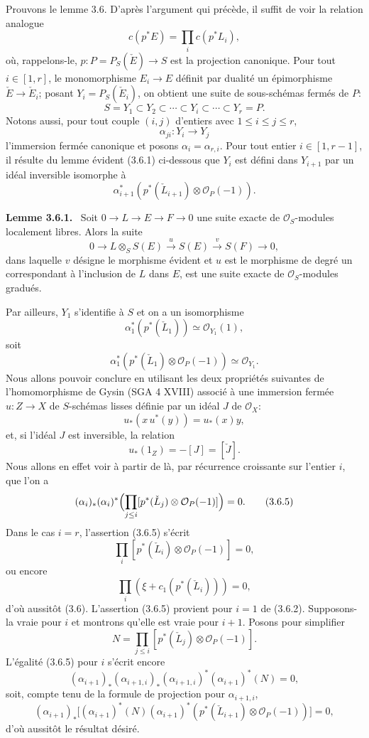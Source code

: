 \documentclass[11pt]{article}
\newenvironment{statement}[1]{\par\medskip\noindent\textbf{#1.}\ }{\par\medskip}
\begin{document}
Prouvons le lemme 3.6. D'après l'argument qui précède, il suffit de voir la relation analogue
\[
c(p^*E)=\prod_i c(p^*L_i),
\]
où, rappelons-le, $p:P=P_S(\check E)\to S$ est la projection canonique. Pour tout $i\in[1,r]$, le monomorphisme $E_i\to E$ définit par dualité un épimorphisme $\check E\to\check E_i$; posant $Y_i=P_S(\check E_i)$, on obtient une suite de sous-schémas fermés de $P$:
\[
S=Y_1\subset Y_2\subset\cdots\subset Y_i\subset\cdots\subset Y_r=P.
\]
Notons aussi, pour tout couple $(i,j)$ d'entiers avec $1\le i\le j\le r$,
\[
\alpha_{ji}:Y_i\to Y_j
\]
l'immersion fermée canonique et posons $\alpha_i=\alpha_{r,i}$. Pour tout entier $i\in[1,r-1]$, il résulte du lemme évident (3.6.1) ci-dessous que $Y_i$ est défini dans $Y_{i+1}$ par un idéal inversible isomorphe à
\[
\alpha_{i+1}^*(p^*(\check L_{i+1})\otimes\mathcal O_P(-1)).
\]

\begin{statement}{Lemme 3.6.1}
Soit $0\to L\to E\to F\to0$ une suite exacte de $\mathcal O_S$-modules localement libres. Alors la suite
\[
0\to L\otimes_S S(E)\xrightarrow{u}S(E)\xrightarrow{v}S(F)\to0,
\]
dans laquelle $v$ désigne le morphisme évident et $u$ est le morphisme de degré un correspondant à l'inclusion de $L$ dans $E$, est une suite exacte de $\mathcal O_S$-modules gradués.
\end{statement}

Par ailleurs, $Y_1$ s'identifie à $S$ et on a un isomorphisme
\[
\alpha_1^*(p^*(\check L_1))\simeq\mathcal O_{Y_1}(1),
\]
soit
\[
\alpha_1^*(p^*(\check L_1)\otimes\mathcal O_P(-1))\simeq \mathcal O_{Y_1}.
\tag{3.6.2}
\]
Nous allons pouvoir conclure en utilisant les deux propriétés suivantes de l'homomorphisme de Gysin (SGA 4 XVIII) associé à une immersion fermée $u:Z\to X$ de $S$-schémas lisses définie par un idéal $J$ de $\mathcal O_X$:
\[
u_*(x\,u^*(y))=u_*(x)y,
\tag{3.6.3}
\]
et, si l'idéal $J$ est inversible, la relation
\[
u_*(1_Z)=-[J]=[\check J].
\tag{3.6.4}
\]
Nous allons en effet voir à partir de là, par récurrence croissante sur l'entier $i$, que l'on a
\[
(\alpha_i)_*(\alpha_i)^*\Bigl(\prod_{j\le i}[p^*(\check L_j)\otimes\mathcal O_P(-1)]\Bigr)=0.
\tag{3.6.5}
\]
Dans le cas $i=r$, l'assertion (3.6.5) s'écrit
\[
\prod_i[p^*(\check L_i)\otimes\mathcal O_P(-1)]=0,
\]
ou encore
\[
\prod_i(\xi+c_1(p^*(\check L_i)))=0,
\]
d'où aussitôt (3.6). L'assertion (3.6.5) provient pour $i=1$ de (3.6.2). Supposons-la vraie pour $i$ et montrons qu'elle est vraie pour $i+1$. Posons pour simplifier
\[
N=\prod_{j\le i}[p^*(\check L_j)\otimes\mathcal O_P(-1)].
\]
L'égalité (3.6.5) pour $i$ s'écrit encore
\[
(\alpha_{i+1})_*(\alpha_{i+1,i})_*(\alpha_{i+1,i})^*(\alpha_{i+1})^*(N)=0,
\]
soit, compte tenu de la formule de projection pour $\alpha_{i+1,i}$,
\[
(\alpha_{i+1})_*\bigl[(\alpha_{i+1})^*(N)(\alpha_{i+1})^*(p^*(\check L_{i+1})\otimes\mathcal O_P(-1))\bigr]=0,
\]
d'où aussitôt le résultat désiré.
\end{document}
